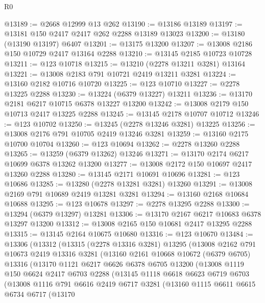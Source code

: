 \begin{lexlean}{R0}
\begin{coremodule}
@13189 := @2668 @12999 @13 @262
@13190 := @13186 @13189
@13197 := @13181 @150 @2417 @2417 @262 @2288 @13189 @13023
@13200 := @13180 (@13190 @13197) @6407
@13201 := @13175 @13200
@13207 := @13008 @2186 @150 @10729 @2417 @13164 @2288
@13210 := @13145 @2185 @10723 @10728
@13211 := @123 @10718
@13215 := @13210 (@2278 @13211 @3281) @13164
@13221 := @13008 @2183 @791 @10721 @2419 @13211 @3281
@13224 := @13160 @2182 @10716 @10720
@13225 := @123 @10710
@13227 := @2278 @13225 @2288
@13230 := @13224 (@6379 @13227) @13211
@13236 := @13170 @2181 @6217 @10715 @6378 @13227 @13200
@13242 := @13008 @2179 @150 @10713 @2417 @13225 @2288
@13245 := @13145 @2178 @10707 @10712
@13246 := @123 @10702
@13250 := @13245 (@2278 @13246 @3281) @13225
@13256 := @13008 @2176 @791 @10705 @2419 @13246 @3281
@13259 := @13160 @2175 @10700 @10704
@13260 := @123 @10694
@13262 := @2278 @13260 @2288
@13265 := @13259 (@6379 @13262) @13246
@13271 := @13170 @2174 @6217 @10699 @6378 @13262 @13200
@13277 := @13008 @2172 @150 @10697 @2417 @13260 @2288
@13280 := @13145 @2171 @10691 @10696
@13281 := @123 @10686
@13285 := @13280 (@2278 @13281 @3281) @13260
@13291 := @13008 @2169 @791 @10689 @2419 @13281 @3281
@13294 := @13160 @2168 @10684 @10688
@13295 := @123 @10678
@13297 := @2278 @13295 @2288
@13300 := @13294 (@6379 @13297) @13281
@13306 := @13170 @2167 @6217 @10683 @6378 @13297 @13200
@13312 := @13008 @2165 @150 @10681 @2417 @13295 @2288
@13315 := @13145 @2164 @10675 @10680
@13316 := @123 @10670
@13484 := @13306
    (@13312
      (@13315
        (@2278 @13316 @3281)
        @13295
        (@13008
          @2162
          @791
          @10673
          @2419
          @13316
          @3281
          (@13160
            @2161
            @10668
            @10672
            (@6379 @6705)
            @13316
            (@13170
              @1121
              @6217
              @6626
              @6378
              @6705
              @13200
              (@13008
                @1119
                @150
                @6624
                @2417
                @6703
                @2288
                (@13145
                  @1118
                  @6618
                  @6623
                  @6719
                  @6703
                  (@13008
                    @1116
                    @791
                    @6616
                    @2419
                    @6717
                    @3281
                    (@13160
                      @1115
                      @6611
                      @6615
                      @6734
                      @6717
                      (@13170

\end{coremodule}
\end{lexlean}
